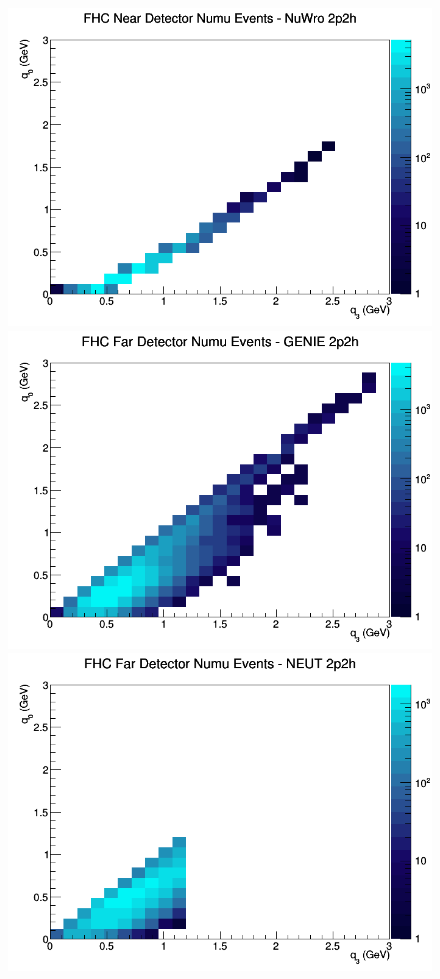 \documentclass[12pt]{article}
\begin{document}
\begin{figure}[h]
\includegraphics[width=\linewidth]{q0_q3/nominal/2p2h_FHC_ND_numu_q3_q0_NuWro.png}
\endminipage
\newline
{}
\includegraphics[width=\linewidth]{q0_q3/nominal/2p2h_FHC_FD_numu_q3_q0_GENIE.png}
\endminipage
{}
\includegraphics[width=\linewidth]{q0_q3/nominal/2p2h_FHC_FD_numu_q3_q0_NEUT.png}

\end{figure}
\end{document}
